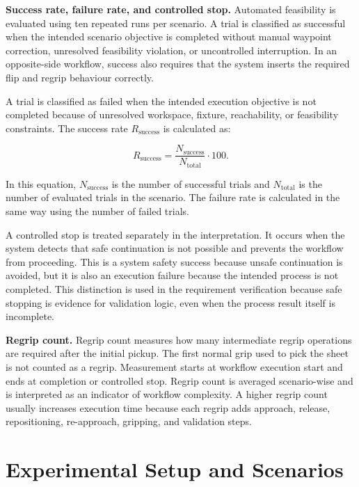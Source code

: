 \label{subsec:success-failure-definition}
\noindent\textbf{Success rate, failure rate, and controlled stop.}
Automated feasibility is evaluated using ten repeated runs per scenario. A trial is classified as successful when the intended scenario objective is completed without manual waypoint correction, unresolved feasibility violation, or uncontrolled interruption. In an opposite-side workflow, success also requires that the system inserts the required flip and regrip behaviour correctly.

A trial is classified as failed when the intended execution objective is not completed because of unresolved workspace, fixture, reachability, or feasibility constraints. The success rate \(R_{\mathrm{success}}\) is calculated as:

\begin{equation}
R_{\mathrm{success}}=\frac{N_{\mathrm{success}}}{N_{\mathrm{total}}}\cdot100 .
\label{eq:success-rate}
\end{equation}

In this equation, \(N_{\mathrm{success}}\) is the number of successful trials and \(N_{\mathrm{total}}\) is the number of evaluated trials in the scenario. The failure rate is calculated in the same way using the number of failed trials.

A controlled stop is treated separately in the interpretation. It occurs when the system detects that safe continuation is not possible and prevents the workflow from proceeding. This is a system safety success because unsafe continuation is avoided, but it is also an execution failure because the intended process is not completed. This distinction is used in the requirement verification because safe stopping is evidence for validation logic, even when the process result itself is incomplete.

\label{subsec:regrip-count-definition}
\noindent\textbf{Regrip count.}
Regrip count measures how many intermediate regrip operations are required after the initial pickup. The first normal grip used to pick the sheet is not counted as a regrip. Measurement starts at workflow execution start and ends at completion or controlled stop. Regrip count is averaged scenario-wise and is interpreted as an indicator of workflow complexity. A higher regrip count usually increases execution time because each regrip adds approach, release, repositioning, re-approach, gripping, and validation steps.

\section{Experimental Setup and Scenarios}
\label{sec:experimental-setup-scenarios}


